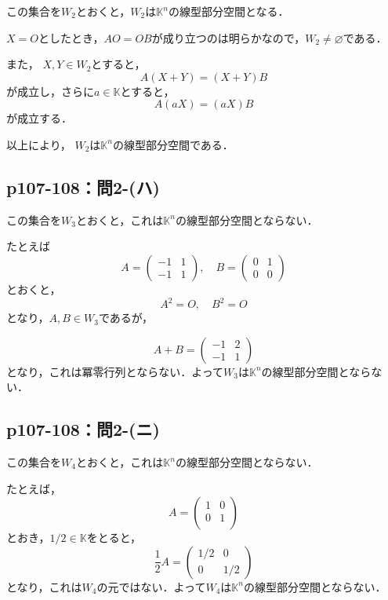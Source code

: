 \documentclass[a4paper,10pt,fleqn]{ltjsarticle}
\begin{document}
\begin{tleftbar}
    この集合を$W_2$とおくと，$W_2$は$\mathbb{K}^n$の線型部分空間となる．

    $X =O$としたとき，$A O = OB$が成り立つのは明らかなので，$ W_2 \ne \varnothing$である．

    また， $X,Y \in W_2$とすると，
    \[
        A(X+Y)=(X+Y)B
    \]
    が成立し，さらに$ a\in \mathbb{K}$とすると，
    \[
        A(aX)=(aX)B
    \]
    が成立する．

    以上により， $W_2$は$\mathbb{K}^n$の線型部分空間である．
\end{tleftbar}

\subsection*{p107-108：問2-(ハ)}

\begin{tleftbar}
    この集合を$W_3$とおくと，これは$\mathbb{K}^n$の線型部分空間とならない．

    たとえば
    \[
        A = \begin{pmatrix} -1 & 1 \\ -1 & 1 \end{pmatrix} , \quad B = \begin{pmatrix} 0 & 1 \\ 0 & 0 \end{pmatrix}
    \]
    とおくと，
    \[
        A^2 = O , \quad B^2 =O
    \]
    となり，$A ,B \in W_3$であるが，

    \[
        A+B = \begin{pmatrix} -1 & 2\\-1 & 1\end{pmatrix}
    \]
    となり，これは冪零行列とならない．よって$W_3$は$\mathbb{K}^n$の線型部分空間とならない．
\end{tleftbar}

\subsection*{p107-108：問2-(ニ)}

\begin{tleftbar}
    この集合を$W_4$とおくと，これは$\mathbb{K}^n$の線型部分空間とならない．

    たとえば，
    \[
        A= \begin{pmatrix} 1 & 0 \\ 0 & 1 \\ \end{pmatrix}
    \]
    とおき，$ 1/2 \in \mathbb{K}$をとると，
    \[
        \frac{1}{2} A = \begin{pmatrix} 1/2 & 0 \\ 0 & 1/2 \end{pmatrix}
    \]
    となり，これは$W_4$の元ではない．よって$W_4$は$\mathbb{K}^n$の線型部分空間とならない．
\end{tleftbar}
\newpage
\end{document}
